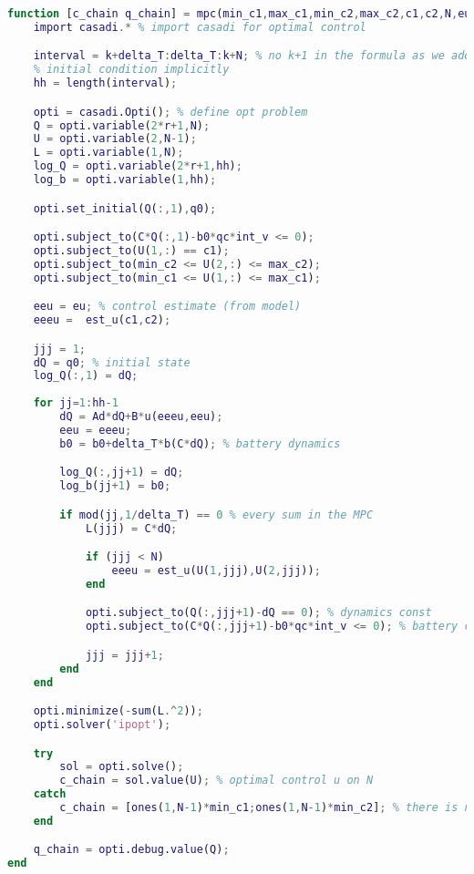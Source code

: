 \begin{lstlisting}[language=Matlab,caption={[Model predictive control]Model predictive control.},captionpos=b,label=lst:mpc]
function [c_chain q_chain] = mpc(min_c1,max_c1,min_c2,max_c2,c1,c2,N,eu,b0,b,qc,int_v,q0,Ad,B,C,u,est_u,k,delta_T,r)
    import casadi.* % import casadi for optimal control

    interval = k+delta_T:delta_T:k+N; % no k+1 in the formula as we add the 
    % initial condition implicitly
    hh = length(interval);

    opti = casadi.Opti(); % define opt problem
    Q = opti.variable(2*r+1,N);
    U = opti.variable(2,N-1);
    L = opti.variable(1,N);
    log_Q = opti.variable(2*r+1,hh);
    log_b = opti.variable(1,hh);

    opti.set_initial(Q(:,1),q0);

    opti.subject_to(C*Q(:,1)-b0*qc*int_v <= 0);
    opti.subject_to(U(1,:) == c1);
    opti.subject_to(min_c2 <= U(2,:) <= max_c2);
    opti.subject_to(min_c1 <= U(1,:) <= max_c1);

    eeu = eu; % control estimate (from model)
    eeeu =  est_u(c1,c2);

    jjj = 1;
    dQ = q0; % initial state
    log_Q(:,1) = dQ; 
    
    for jj=1:hh-1
        dQ = Ad*dQ+B*u(eeeu,eeu);
        eeu = eeeu;
        b0 = b0+delta_T*b(C*dQ); % battery dynamics

        log_Q(:,jj+1) = dQ;
        log_b(jj+1) = b0; 

        if mod(jj,1/delta_T) == 0 % every sum in the MPC
            L(jjj) = C*dQ;

            if (jjj < N)                
                eeeu = est_u(U(1,jjj),U(2,jjj));
            end

            opti.subject_to(Q(:,jjj+1)-dQ == 0); % dynamics const
            opti.subject_to(C*Q(:,jjj+1)-b0*qc*int_v <= 0); % battery const

            jjj = jjj+1;
        end             
    end

    opti.minimize(-sum(L.^2));
    opti.solver('ipopt');

    try
        sol = opti.solve();
        c_chain = sol.value(U); % optimal control u on N
    catch
        c_chain = [ones(1,N-1)*min_c1;ones(1,N-1)*min_c2]; % there is no control which sattisfies consts
    end            

    q_chain = opti.debug.value(Q);
end
\end{lstlisting}
